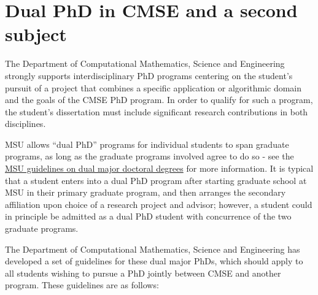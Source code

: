 \section{Dual PhD in CMSE and a second subject}
\label{sec:dual_phd}

The Department of Computational Mathematics, Science and Engineering
strongly supports interdisciplinary PhD programs centering on the
student's pursuit of a project that combines a specific application or
algorithmic domain and the goals of the CMSE PhD program.  In order to
qualify for such a program, the student's dissertation must include
significant research contributions in both disciplines.

MSU allows ``dual PhD'' programs for individual students to span
graduate programs, as long as the graduate programs involved agree to
do so - see the
\href{https://reg.msu.edu/AcademicPrograms/Text.asp?Section=111#s407}{MSU
  guidelines on dual major doctoral degrees} for more information.  It
is typical that a student enters into a dual PhD program after
starting graduate school at MSU in their primary graduate program, and then
arranges the secondary affiliation upon choice of a research project
and advisor; however, a student could in principle be admitted as a
dual PhD student with concurrence of the two graduate programs.

The Department of Computational Mathematics, Science and Engineering
has developed a set of guidelines for these dual major PhDs, which
should apply to all students wishing to pursue a PhD jointly between
CMSE and another program.  These guidelines are as follows:

